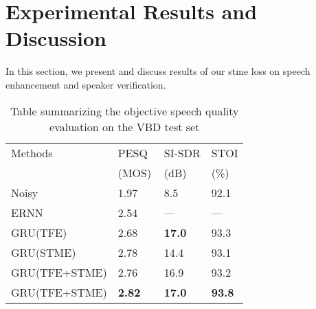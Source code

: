 \documentclass{article}
\begin{document}
\section{Experimental Results and Discussion}In this section, we present and discuss results of our \gls{stme} loss on speech enhancement and speaker verification.

\begin{table}
\centering
\caption{Table summarizing the objective speech quality evaluation on the VBD test set}
\begin{tabular}{l|l|l|l}
Methods                        & PESQ~ & SI-SDR & STOI  \\
                               & (MOS) & (dB)   & (\%)  \\ 
\hline
Noisy                          & 1.97       & 8.5        & 92.1       \\
ERNN \cite{takeuchi2020real}                      & 2.54       &  ---      &  ---     \\
GRU(TFE)                       & 2.68       & \textbf{17.0}       &  93.3     \\
GRU(STME)                      & 2.78      & 14.4       &  93.1     \\
GRU(TFE+STME)         & 2.76       & 16.9        & 93.2       \\
GRU(TFE+STME)                & \textbf{2.82}       & \textbf{17.0}        & \textbf{93.8}     
\end{tabular}
\label{table:Valentini-results}
\vspace{-.5 cm}

\end{table}

\begin{table}
\end{table}
\end{document}
